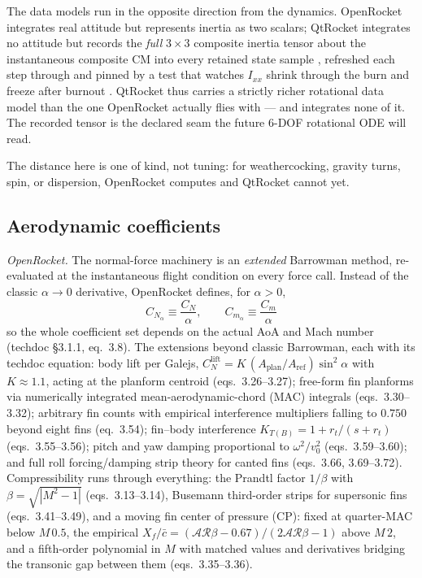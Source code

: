 \begin{keyinsight}
The data models run in the opposite direction from the dynamics. OpenRocket integrates real
attitude but represents inertia as two scalars; QtRocket integrates no attitude but records
the \emph{full} $3\times 3$ composite inertia tensor about the instantaneous composite CM
into every retained state sample , refreshed each step through
  and pinned by a test that watches
$I_{xx}$ shrink through the burn and freeze after burnout
. QtRocket thus carries a strictly richer
rotational data model than the one OpenRocket actually flies with --- and integrates none of
it. The recorded tensor is the declared seam the future 6-DOF rotational ODE will read.
\end{keyinsight}

The distance here is one of kind, not tuning: for weathercocking, gravity turns, spin, or
dispersion, OpenRocket computes and QtRocket cannot yet.

\subsection{Aerodynamic coefficients}\label{app:or-methods-aero}

\emph{OpenRocket.} The normal-force machinery is an \emph{extended} Barrowman method,
re-evaluated at the instantaneous flight condition on every force call. Instead of the
classic $\alpha \to 0$ derivative, OpenRocket defines, for $\alpha > 0$,
\begin{equation}
C_{N_\alpha} \equiv \frac{C_N}{\alpha}, \qquad C_{m_\alpha} \equiv \frac{C_m}{\alpha}
\end{equation}
so the whole coefficient set depends on the actual AoA and Mach number (techdoc \S 3.1.1,
eq.~3.8). The extensions beyond classic Barrowman, each with its techdoc equation: body lift
per Galejs, $C_N^{\text{lift}} = K\,(A_{\mathrm{plan}}/A_{\mathrm{ref}})\sin^2\alpha$ with
$K \approx 1.1$, acting at the planform centroid (eqs.~3.26--3.27); free-form fin planforms
via numerically integrated mean-aerodynamic-chord (MAC) integrals (eqs.~3.30--3.32);
arbitrary fin counts with empirical interference multipliers falling to $0.750$ beyond eight
fins (eq.~3.54); fin--body interference $K_{T(B)} = 1 + r_t/(s + r_t)$ (eqs.~3.55--3.56);
pitch and yaw damping proportional to $\omega^2/v_0^2$ (eqs.~3.59--3.60); and full roll
forcing/damping strip theory for canted fins (eqs.~3.66, 3.69--3.72). Compressibility runs
through everything: the Prandtl factor $1/\beta$ with $\beta = \sqrt{|M^2-1|}$
(eqs.~3.13--3.14), Busemann third-order strips for supersonic fins (eqs.~3.41--3.49), and a
moving fin center of pressure (CP): fixed at quarter-MAC below $M\,0.5$, the empirical
$X_f/\bar c = (\mathcal{AR}\beta - 0.67)/(2\mathcal{AR}\beta - 1)$ above $M\,2$, and a
fifth-order polynomial in $M$ with matched values and derivatives bridging the transonic gap
between them (eqs.~3.35--3.36).

